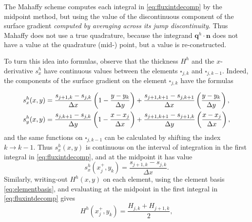 \documentclass[11pt]{amsart}
\newcommand\bn{\mathbf{n}}
\newcommand\bq{\mathbf{q}}
\begin{document}
The Mahaffy scheme computes each integral in \eqref{eq:fluxintdecomp} by the midpoint method, but using the value of the discontinuous component of the surface gradient \emph{computed by averaging across its jump discontinuity}.  Thus Mahaffy does not use a true quadrature, because the integrand $\bq^h\cdot \bn$ does not have a value at the quadrature (mid-) point, but a value is re-constructed.

To turn this idea into formulas, observe that the thickness $H^h$ and the $x$-derivative $s^h_x$ have continuous values between the elements $\square_{j,k}$ and $\square_{j,k-1}$.  Indeed, the components of the surface gradient on the element $\square_{j,k}$ have the formulas
	\begin{comment}
	COMMENT OUT: here is the surface elevation on $\square_{j,k}$
	\begin{align*}
	s^h(x,y) &= s_{j,k} \left(1-\tfrac{x-x_j}{\Delta x}\right) \left(1-\tfrac{y-y_k}{\Delta y}\right)
	    + s_{j+1,k} \left(\tfrac{x-x_j}{\Delta x}\right) \left(1-\tfrac{y-y_k}{\Delta y}\right) \\
	         &\qquad + s_{j,k+1} \left(1-\tfrac{x-x_j}{\Delta x}\right) \left(\tfrac{y-y_k}{\Delta y}\right)
	    + s_{j+1,k+1} \left(\tfrac{x-x_j}{\Delta x}\right) \left(\tfrac{y-y_k}{\Delta y}\right)
	\end{align*}
	\end{comment}
\begin{align}
s^h_x(x,y) &= \frac{s_{j+1,k}-s_{j,k}}{\Delta x} \left(1-\frac{y-y_k}{\Delta y}\right) + \frac{s_{j+1,k+1}-s_{j,k+1}}{\Delta x} \left(\frac{y-y_k}{\Delta y}\right), \label{eq:grads} \\
s^h_y(x,y) &= \frac{s_{j,k+1}-s_{j,k}}{\Delta y} \left(1-\frac{x-x_j}{\Delta x}\right) + \frac{s_{j+1,k+1}-s_{j+1,k}}{\Delta y} \left(\frac{x-x_j}{\Delta x}\right), \notag
\end{align}
and the same functions on $\square_{j,k-1}$ can be calculated by shifting the index $k\to k-1$.  Thus $s^h_x(x,y)$ is continuous on the interval of integration in the first integral in \eqref{eq:fluxintdecomp}, and at the midpoint it has value
\begin{equation}
s^h_x(x_j^+,y_k) = \frac{s_{j+1,k}-s_{j,k}}{\Delta x}. \label{eq:femsxstag}
\end{equation}
Similarly, writing-out $H^h(x,y)$ on each element, using the element basis \eqref{eq:elementbasis}, and evaluating at the midpoint in the first integral in \eqref{eq:fluxintdecomp} gives
\begin{equation}
H^h(x_j^+,y_k) = \frac{H_{j,k}+H_{j+1,k}}{2}, \label{eq:femHstag}
\end{equation}
\end{document}
